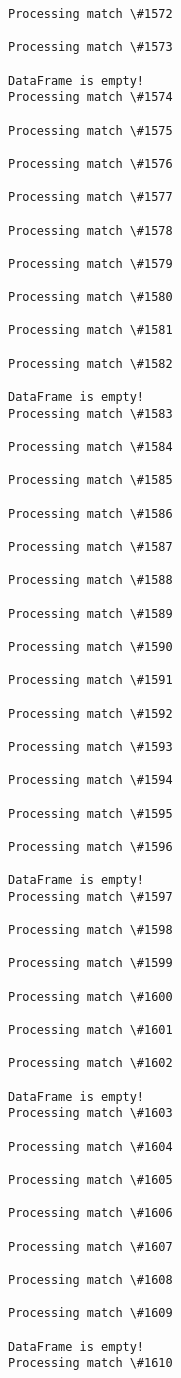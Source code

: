 \documentclass[11pt]{article}
\begin{document}
\begin{Verbatim}[commandchars=\\\{\}]
Processing match \#1572

Processing match \#1573

DataFrame is empty!
Processing match \#1574

Processing match \#1575

Processing match \#1576

Processing match \#1577

Processing match \#1578

Processing match \#1579

Processing match \#1580

Processing match \#1581

Processing match \#1582

DataFrame is empty!
Processing match \#1583

Processing match \#1584

Processing match \#1585

Processing match \#1586

Processing match \#1587

Processing match \#1588

Processing match \#1589

Processing match \#1590

Processing match \#1591

Processing match \#1592

Processing match \#1593

Processing match \#1594

Processing match \#1595

Processing match \#1596

DataFrame is empty!
Processing match \#1597

Processing match \#1598

Processing match \#1599

Processing match \#1600

Processing match \#1601

Processing match \#1602

DataFrame is empty!
Processing match \#1603

Processing match \#1604

Processing match \#1605

Processing match \#1606

Processing match \#1607

Processing match \#1608

Processing match \#1609

DataFrame is empty!
Processing match \#1610


\end{Verbatim}
\end{document}
